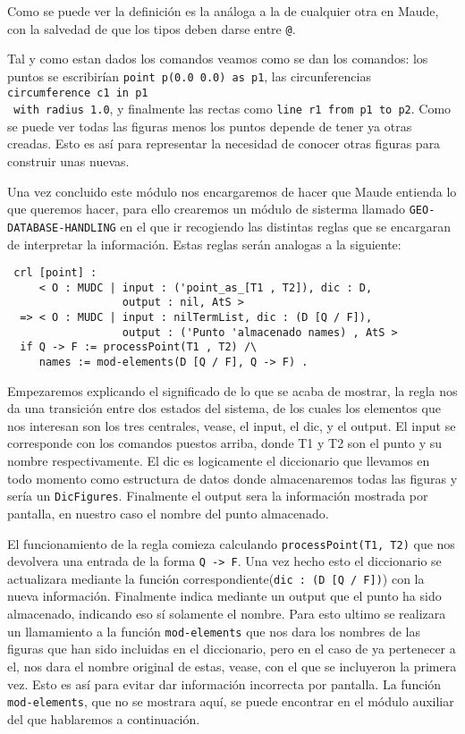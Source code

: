 Como se puede ver la definición es la análoga a la de cualquier otra en Maude, con la salvedad de que los tipos deben darse entre \verb"@". \par 

Tal y como estan dados los comandos veamos como se dan los comandos: los puntos se escribirían \verb"point p(0.0 0.0) as p1", las circunferencias \verb"circumference c1 in p1" \\ \verb" with radius 1.0", y finalmente las rectas como \verb"line r1 from p1 to p2". Como se puede ver todas las figuras menos los puntos depende de tener ya otras creadas. Esto es así para representar la necesidad de conocer otras figuras para construir unas nuevas.\par

Una vez concluido este módulo nos encargaremos de hacer que Maude entienda lo que queremos hacer, para ello crearemos un módulo de sisterma llamado \verb"GEO-DATABASE-HANDLING" en el que ir recogiendo las distintas reglas que se encargaran de interpretar la información. Estas reglas serán analogas a la siguiente:\par

{\codesize
\begin{verbatim}
 crl [point] :
     < O : MUDC | input : ('point_as_[T1 , T2]), dic : D,
                  output : nil, AtS >
  => < O : MUDC | input : nilTermList, dic : (D [Q / F]),
                  output : ('Punto 'almacenado names) , AtS >
  if Q -> F := processPoint(T1 , T2) /\
     names := mod-elements(D [Q / F], Q -> F) .
\end{verbatim}
}
Empezaremos explicando el significado de lo que se acaba de mostrar, la regla nos da una transición entre dos estados del sistema, de los cuales los elementos que nos interesan son los tres centrales, vease, el input, el dic, y el output. El input se corresponde con los comandos puestos arriba, donde T1 y T2 son el punto y su nombre respectivamente. El dic es logicamente el diccionario que llevamos en todo momento como estructura de datos donde almacenaremos todas las figuras y sería un \verb"DicFigures". Finalmente el output sera la información mostrada por pantalla, en nuestro caso el nombre del punto almacenado. \par

El funcionamiento de la regla comieza calculando \texttt{processPoint(T1, T2)} que nos devolvera una entrada de la forma \texttt{Q -> F}. Una vez hecho esto el diccionario se actualizara mediante la función correspondiente(\verb"dic : (D [Q / F])") con la nueva información. Finalmente indica mediante un output que el punto ha sido almacenado, indicando eso sí solamente el nombre. Para esto ultimo se realizara un llamamiento a la función \texttt{mod-elements} que nos dara los nombres de las figuras que han sido incluidas en el diccionario, pero en el caso de ya pertenecer a el, nos dara el nombre original de estas, vease, con el que se incluyeron la primera vez. Esto es así para evitar dar información incorrecta por pantalla. La función \texttt{mod-elements}, que no se mostrara aquí, se puede encontrar en el módulo auxiliar del que hablaremos a continuación.\par

